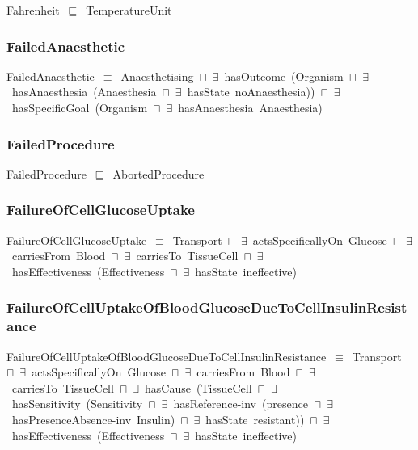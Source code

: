 \documentclass{article}
\begin{document}
Fahrenheit~\ensuremath{\sqsubseteq}~TemperatureUnit~

\subsubsection*{FailedAnaesthetic}

FailedAnaesthetic~\ensuremath{\equiv}~Anaesthetising~\ensuremath{\sqcap}~\ensuremath{\exists}~hasOutcome~(Organism~\ensuremath{\sqcap}~\ensuremath{\exists}~hasAnaesthesia~(Anaesthesia~\ensuremath{\sqcap}~\ensuremath{\exists}~hasState~noAnaesthesia))~\ensuremath{\sqcap}~\ensuremath{\exists}~hasSpecificGoal~(Organism~\ensuremath{\sqcap}~\ensuremath{\exists}~hasAnaesthesia~Anaesthesia)

\subsubsection*{FailedProcedure}

FailedProcedure~\ensuremath{\sqsubseteq}~AbortedProcedure~

\subsubsection*{FailureOfCellGlucoseUptake}

FailureOfCellGlucoseUptake~\ensuremath{\equiv}~Transport~\ensuremath{\sqcap}~\ensuremath{\exists}~actsSpecificallyOn~Glucose~\ensuremath{\sqcap}~\ensuremath{\exists}~carriesFrom~Blood~\ensuremath{\sqcap}~\ensuremath{\exists}~carriesTo~TissueCell~\ensuremath{\sqcap}~\ensuremath{\exists}~hasEffectiveness~(Effectiveness~\ensuremath{\sqcap}~\ensuremath{\exists}~hasState~ineffective)

\subsubsection*{FailureOfCellUptakeOfBloodGlucoseDueToCellInsulinResistance}

FailureOfCellUptakeOfBloodGlucoseDueToCellInsulinResistance~\ensuremath{\equiv}~Transport~\ensuremath{\sqcap}~\ensuremath{\exists}~actsSpecificallyOn~Glucose~\ensuremath{\sqcap}~\ensuremath{\exists}~carriesFrom~Blood~\ensuremath{\sqcap}~\ensuremath{\exists}~carriesTo~TissueCell~\ensuremath{\sqcap}~\ensuremath{\exists}~hasCause~(TissueCell~\ensuremath{\sqcap}~\ensuremath{\exists}~hasSensitivity~(Sensitivity~\ensuremath{\sqcap}~\ensuremath{\exists}~hasReference-inv~(presence~\ensuremath{\sqcap}~\ensuremath{\exists}~hasPresenceAbsence-inv~Insulin)~\ensuremath{\sqcap}~\ensuremath{\exists}~hasState~resistant))~\ensuremath{\sqcap}~\ensuremath{\exists}~hasEffectiveness~(Effectiveness~\ensuremath{\sqcap}~\ensuremath{\exists}~hasState~ineffective)
\end{document}
